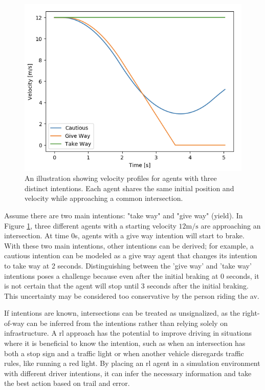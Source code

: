 \begin{figure}[h]
	\centering
	\includegraphics[width=0.6\columnwidth]{YourThesis/papers/mpc/figures/velocity_profiles_agents.png}

	\caption{An illustration showing velocity profiles for agents with three distinct intentions. Each agent shares the same initial position and velocity while approaching a common intersection.}
	\label{fig:intro_intention_profiles}
\end{figure}


Assume there are two main intentions: "take way" and "give way" (yield). In Figure \ref{fig:intro_intention_profiles}, three different agents with a starting velocity $12\mathrm{m/s}$ are approaching an intersection. At time $0$s, agents with a give way intention will start to brake. With these two main intentions, other intentions can be derived; for example, a cautious intention can be modeled as a give way agent that changes its intention to take way at 2 seconds. Distinguishing between the 'give way' and 'take way' intentions poses a challenge because even after the initial braking at 0 seconds, it is not certain that the agent will stop until 3 seconds after the initial braking. This uncertainty may be considered too conservative by the person riding the \gls{av}. 

If intentions are known, intersections can be treated as unsignalized, as the right-of-way can be inferred from the intentions rather than relying solely on infrastructure. A \gls{rl} approach has the potential to improve driving in situations where it is beneficial to know the intention, such as when an intersection has both a stop sign and a traffic light or when another vehicle disregards traffic rules, like running a red light. By placing an \gls{rl} agent in a simulation environment with different driver intentions, it can infer the necessary information and take the best action based on trail and error. 
